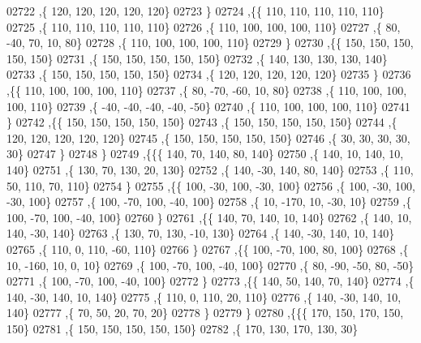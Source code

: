 \begin{DoxyCode}
02722     ,\{   120,   120,   120,   120,   120\}
02723     \}
02724    ,\{\{   110,   110,   110,   110,   110\}
02725     ,\{   110,   110,   110,   110,   110\}
02726     ,\{   110,   100,   100,   100,   110\}
02727     ,\{    80,   -40,    70,    10,    80\}
02728     ,\{   110,   100,   100,   100,   110\}
02729     \}
02730    ,\{\{   150,   150,   150,   150,   150\}
02731     ,\{   150,   150,   150,   150,   150\}
02732     ,\{   140,   130,   130,   130,   140\}
02733     ,\{   150,   150,   150,   150,   150\}
02734     ,\{   120,   120,   120,   120,   120\}
02735     \}
02736    ,\{\{   110,   100,   100,   100,   110\}
02737     ,\{    80,   -70,   -60,    10,    80\}
02738     ,\{   110,   100,   100,   100,   110\}
02739     ,\{   -40,   -40,   -40,   -40,   -50\}
02740     ,\{   110,   100,   100,   100,   110\}
02741     \}
02742    ,\{\{   150,   150,   150,   150,   150\}
02743     ,\{   150,   150,   150,   150,   150\}
02744     ,\{   120,   120,   120,   120,   120\}
02745     ,\{   150,   150,   150,   150,   150\}
02746     ,\{    30,    30,    30,    30,    30\}
02747     \}
02748    \}
02749   ,\{\{\{   140,    70,   140,    80,   140\}
02750     ,\{   140,    10,   140,    10,   140\}
02751     ,\{   130,    70,   130,    20,   130\}
02752     ,\{   140,   -30,   140,    80,   140\}
02753     ,\{   110,    50,   110,    70,   110\}
02754     \}
02755    ,\{\{   100,   -30,   100,   -30,   100\}
02756     ,\{   100,   -30,   100,   -30,   100\}
02757     ,\{   100,   -70,   100,   -40,   100\}
02758     ,\{    10,  -170,    10,   -30,    10\}
02759     ,\{   100,   -70,   100,   -40,   100\}
02760     \}
02761    ,\{\{   140,    70,   140,    10,   140\}
02762     ,\{   140,    10,   140,   -30,   140\}
02763     ,\{   130,    70,   130,   -10,   130\}
02764     ,\{   140,   -30,   140,    10,   140\}
02765     ,\{   110,     0,   110,   -60,   110\}
02766     \}
02767    ,\{\{   100,   -70,   100,    80,   100\}
02768     ,\{    10,  -160,    10,     0,    10\}
02769     ,\{   100,   -70,   100,   -40,   100\}
02770     ,\{    80,   -90,   -50,    80,   -50\}
02771     ,\{   100,   -70,   100,   -40,   100\}
02772     \}
02773    ,\{\{   140,    50,   140,    70,   140\}
02774     ,\{   140,   -30,   140,    10,   140\}
02775     ,\{   110,     0,   110,    20,   110\}
02776     ,\{   140,   -30,   140,    10,   140\}
02777     ,\{    70,    50,    20,    70,    20\}
02778     \}
02779    \}
02780   ,\{\{\{   170,   150,   170,   150,   150\}
02781     ,\{   150,   150,   150,   150,   150\}
02782     ,\{   170,   130,   170,   130,    30\}

\end{DoxyCode}
